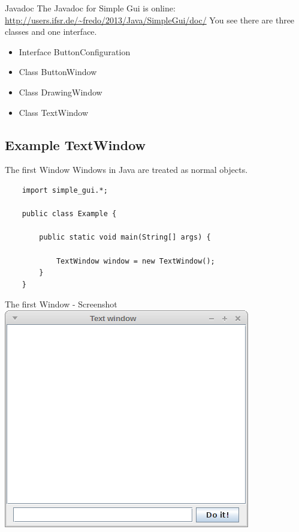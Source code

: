 \begin{frame}{Javadoc}
	The Javadoc for Simple Gui is online:\\
	\url{http://users.ifsr.de/~fredo/2013/Java/SimpleGui/doc/}
	\vfill
	You see there are three classes and one interface.
	\begin{itemize}
		\item Interface ButtonConfiguration
		\item Class ButtonWindow
		\item Class DrawingWindow
		\item Class TextWindow
	\end{itemize}
\end{frame}

\subsection{Example TextWindow}
\begin{frame}[fragile]{The first Window}
	Windows in Java are treated as normal objects.
	\begin{lstlisting}
	import simple_gui.*;

	public class Example {

	    public static void main(String[] args) {
		
	        TextWindow window = new TextWindow();
	    }
	}	
	\end{lstlisting}
\end{frame}

\begin{frame}{The first Window - Screenshot}
	\includegraphics[scale=0.4]{res/gui_empty.png}
\end{frame}

